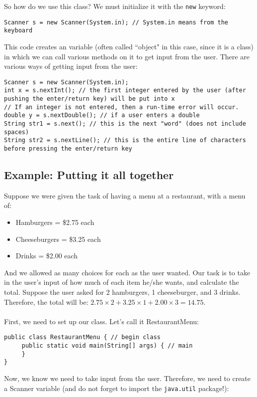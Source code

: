 \noindent So how do we use this class? We must initialize it with the \verb|new| keyword:
\begin{lstlisting}
Scanner s = new Scanner(System.in); // System.in means from the keyboard
\end{lstlisting}
\noindent This code creates an variable (often called ``object" in this case, since it is a class) in which we can call various methods on it to get input from the user. There are various ways of getting input from the user:

\begin{lstlisting}
Scanner s = new Scanner(System.in);
int x = s.nextInt(); // the first integer entered by the user (after pushing the enter/return key) will be put into x
// If an integer is not entered, then a run-time error will occur.
double y = s.nextDouble(); // if a user enters a double
String str1 = s.next(); // this is the next "word" (does not include spaces)
String str2 = s.nextLine(); // this is the entire line of characters before pressing the enter/return key
\end{lstlisting}

\subsection{Example: Putting it all together}
Suppose we were given the task of having a menu at a restaurant, with a menu of: 
\begin{itemize}
\item Hamburgers = \$2.75 each
\item Cheeseburgers = \$3.25 each
\item Drinks = \$2.00 each
\end{itemize}
And we allowed as many choices for each as the user wanted. Our task is to take in the user's input of how much of each item he/she wants, and calculate the total. Suppose the user asked for 2 hamburgers, 1 cheeseburger, and 3 drinks. Therefore, the total will be: $2.75 \times 2 + 3.25 \times 1 + 2.00 \times 3 = 14.75$.
\\ \\
First, we need to set up our class. Let's call it RestaurantMenu:
\begin{lstlisting}
public class RestaurantMenu { // begin class
     public static void main(String[] args) { // main
     }
}
\end{lstlisting}

Now, we know we need to take input from the user. Therefore, we need to create a Scanner variable (and do not forget to import the \verb|java.util| package!):

